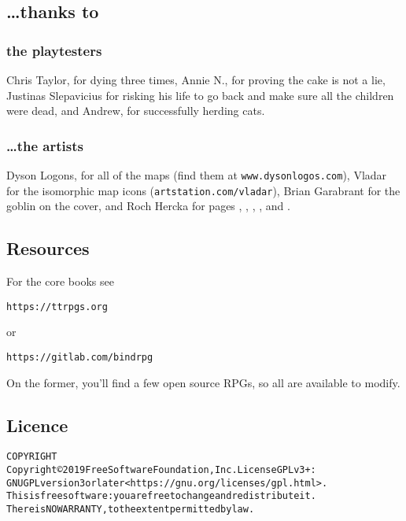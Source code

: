 \vspace{3cm}

\begin{multicols}{2}

\subsection*{\ldots thanks to}
\subsubsection*{the playtesters}
Chris Taylor, for dying three times,
Annie N., for proving the cake is not a lie,
Justinas Slepavicius for risking his life to go back and make sure all the children were dead,
and Andrew, for successfully herding cats.

\subsubsection*{\ldots the artists}

Dyson Logons, for all of the maps (find them at {\tt www.dysonlogos.com}),
\iftoggle{hardcore}{%
Daniel F. Walthall for the flat dungeon icon images in the Alchemist's tower,
}{}%
Vladar for the isomorphic map icons ({\tt artstation.com/vladar}),
Brian Garabrant for the goblin on the cover,
and Roch Hercka for pages \pageref{roch:transformation}, \pageref{roch:waking}, \pageref{roch:dragon}, \pageref{roch:garden}, and \pageref{roch:ogres}.

\columnbreak

\subsection{Resources}

For the core books see 

\begin{alltt} https://ttrpgs.org \end{alltt} 
or 
\begin{alltt} https://gitlab.com/bindrpg \end{alltt}
On the former, you'll find a few open source RPGs, so all are available to modify.

\end{multicols}

\subsection*{Licence}

\begin{alltt}
COPYRIGHT
       Copyright \copyright 2019 Free Software Foundation, Inc.  License GPLv3+:
	GNU GPL version 3 or later <https://gnu.org/licenses/gpl.html>.
       This is free software: you are free to change and redistribute it.
	There is NO WARRANTY, to the extent permitted by law.

\end{alltt}

